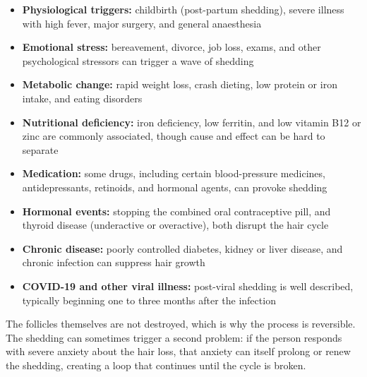 \begin{itemize}
    \item \textbf{Physiological triggers:} childbirth (post-partum shedding), severe illness with high fever, major surgery, and general anaesthesia
    \item \textbf{Emotional stress:} bereavement, divorce, job loss, exams, and other psychological stressors can trigger a wave of shedding
    \item \textbf{Metabolic change:} rapid weight loss, crash dieting, low protein or iron intake, and eating disorders
    \item \textbf{Nutritional deficiency:} iron deficiency, low ferritin, and low vitamin B12 or zinc are commonly associated, though cause and effect can be hard to separate
    \item \textbf{Medication:} some drugs, including certain blood-pressure medicines, antidepressants, retinoids, and hormonal agents, can provoke shedding
    \item \textbf{Hormonal events:} stopping the combined oral contraceptive pill, and thyroid disease (underactive or overactive), both disrupt the hair cycle
    \item \textbf{Chronic disease:} poorly controlled diabetes, kidney or liver disease, and chronic infection can suppress hair growth
    \item \textbf{COVID-19 and other viral illness:} post-viral shedding is well described, typically beginning one to three months after the infection
\end{itemize}

The follicles themselves are not destroyed, which is why the process is reversible. The shedding can sometimes trigger a second problem: if the person responds with severe anxiety about the hair loss, that anxiety can itself prolong or renew the shedding, creating a loop that continues until the cycle is broken.

